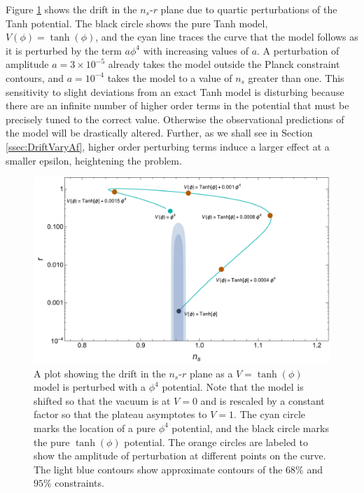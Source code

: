 \documentclass[a4paper,11pt]{article}
\def\nsr{$n_s$-$r$ }
\begin{document}
Figure \ref{fig:LFP_tanh_drift_detail} shows the drift in the \nsr plane due to quartic perturbations of the Tanh potential. The black circle shows the pure Tanh model, $V(\phi)=\tanh(\phi)$, and the cyan line traces the curve that the model follows as it is perturbed by the term $a\phi^4$ with increasing values of $a$. A perturbation of amplitude $a=3\times10^{-5}$ already takes the model outside the Planck constraint contours,  and $a=10^{-4}$ takes the model to a value of $n_s$ greater than one. This sensitivity to slight deviations from an exact Tanh model is disturbing because there are an infinite number of higher order terms in the potential that must be precisely tuned to the correct value. Otherwise the observational predictions of the model will be drastically altered. Further, as we shall see in Section \ref{ssec:DriftVaryAf}, higher order perturbing terms induce a larger effect at a smaller epsilon, heightening the problem.

\begin{figure}[H]
	\centering
	\includegraphics[width=\textwidth]{figures/TanhDriftLabeledPointsPlanck.pdf}
	\caption[Drift in \nsr plane for Tanh model with perturbations (more detailed plot).]{A plot showing the drift in the \nsr plane as a $V=\tanh(\phi)$ model is perturbed with a $\phi^4$ potential. Note that the model is shifted so that the vacuum is at $V=0$ and is rescaled by a constant factor so that the plateau asymptotes to $V=1$. The cyan circle marks the location of a pure $\phi^4$ potential, and the black circle marks the pure $\tanh(\phi)$ potential. The orange circles are labeled to show the amplitude of perturbation at different points on the curve. The light blue contours show approximate contours of the \citet{Planck2015} $68\%$ and $95\%$ constraints.}
	\label{fig:LFP_tanh_drift_detail}
\end{figure}
\end{document}
